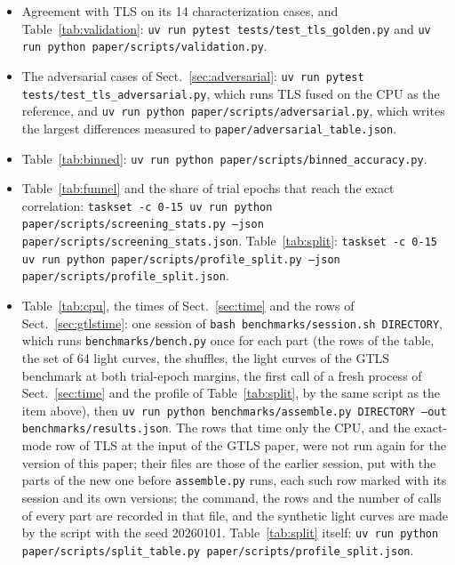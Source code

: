 \documentclass{aastex631}
\begin{document}
\begin{itemize}
\item Agreement with TLS on its 14 characterization cases, and Table~\ref{tab:validation}: \texttt{uv run pytest tests/test\_tls\_golden.py} and \texttt{uv run python paper/scripts/validation.py}.
\item The adversarial cases of Sect.~\ref{sec:adversarial}: \texttt{uv run pytest tests/test\_tls\_adversarial.py}, which runs TLS fused on the CPU as the reference, and \texttt{uv run python paper/scripts/adversarial.py}, which writes the largest differences measured to \texttt{paper/adversarial\_table.json}.
\item Table~\ref{tab:binned}: \texttt{uv run python paper/scripts/binned\_accuracy.py}.
\item Table~\ref{tab:funnel} and the share of trial epochs that reach the exact correlation: \texttt{taskset -c 0-15 uv run python paper/scripts/screening\_stats.py --json paper/scripts/screening\_stats.json}. Table~\ref{tab:split}: \texttt{taskset -c 0-15 uv run python paper/scripts/profile\_split.py --json paper/scripts/profile\_split.json}.
\item Table~\ref{tab:cpu}, the times of Sect.~\ref{sec:time} and the rows of Sect.~\ref{sec:gtlstime}: one session of \texttt{bash benchmarks/session.sh DIRECTORY}, which runs \texttt{benchmarks/bench.py} once for each part (the rows of the table, the set of 64 light curves, the shuffles, the light curves of the GTLS benchmark at both trial-epoch margins, the first call of a fresh process of Sect.~\ref{sec:time} and the profile of Table~\ref{tab:split}, by the same script as the item above), then \texttt{uv run python benchmarks/assemble.py DIRECTORY --out benchmarks/results.json}. The rows that time only the CPU, and the exact-mode row of TLS at the input of the GTLS paper, were not run again for the version of this paper; their files are those of the earlier session, put with the parts of the new one before \texttt{assemble.py} runs, each such row marked with its session and its own versions; the command, the rows and the number of calls of every part are recorded in that file, and the synthetic light curves are made by the script with the seed 20260101. Table~\ref{tab:split} itself: \texttt{uv run python paper/scripts/split\_table.py paper/scripts/profile\_split.json}.

\end{itemize}
\end{document}
